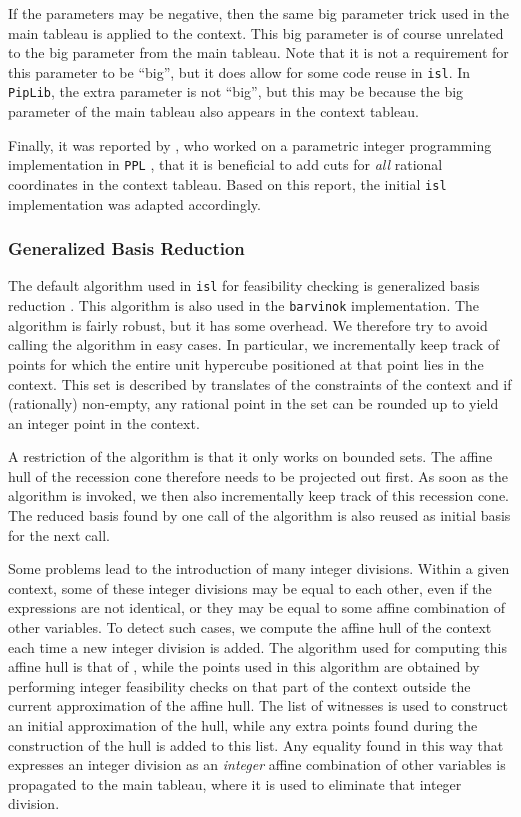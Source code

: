 If the parameters may be negative, then the same big parameter trick
used in the main tableau is applied to the context.  This big parameter
is of course unrelated to the big parameter from the main tableau.
Note that it is not a requirement for this parameter to be ``big'',
but it does allow for some code reuse in {\tt isl}.
In {\tt PipLib}, the extra parameter is not ``big'', but this may be because
the big parameter of the main tableau also appears
in the context tableau.

Finally, it was reported by \textcite{Galea2009personal}, who
worked on a parametric integer programming implementation
in {\tt PPL} \parencite{PPL},
that it is beneficial to add cuts for \emph{all} rational coordinates
in the context tableau.  Based on this report,
the initial {\tt isl} implementation was adapted accordingly.

\subsubsection{Generalized Basis Reduction}\label{s:GBR}

The default algorithm used in {\tt isl} for feasibility checking
is generalized basis reduction \parencite{Cook1991implementation}.
This algorithm is also used in the {\tt barvinok} implementation.
The algorithm is fairly robust, but it has some overhead.
We therefore try to avoid calling the algorithm in easy cases.
In particular, we incrementally keep track of points for which
the entire unit hypercube positioned at that point lies in the context.
This set is described by translates of the constraints of the context
and if (rationally) non-empty, any rational point
in the set can be rounded up to yield an integer point in the context.

A restriction of the algorithm is that it only works on bounded sets.
The affine hull of the recession cone therefore needs to be projected
out first.  As soon as the algorithm is invoked, we then also
incrementally keep track of this recession cone.  The reduced basis
found by one call of the algorithm is also reused as initial basis
for the next call.

Some problems lead to the
introduction of many integer divisions.  Within a given context,
some of these integer divisions may be equal to each other, even
if the expressions are not identical, or they may be equal to some
affine combination of other variables.
To detect such cases, we compute the affine hull of the context
each time a new integer division is added.  The algorithm used
for computing this affine hull is that of \textcite{Karr1976affine},
while the points used in this algorithm are obtained by performing
integer feasibility checks on that part of the context outside
the current approximation of the affine hull.
The list of witnesses is used to construct an initial approximation
of the hull, while any extra points found during the construction
of the hull is added to this list.
Any equality found in this way that expresses an integer division
as an \emph{integer} affine combination of other variables is
propagated to the main tableau, where it is used to eliminate that
integer division.

